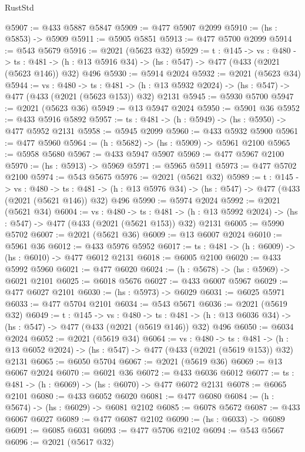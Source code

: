 \begin{lexlean}{RustStd}
\begin{coremodule}
{\begin{coremodule}
{{{{{{{{{{{{{{{{@5907 := @433 @5887 @5847
@5909 := @477 @5907 @2099
@5910 := (hs : @5853) -> @5909
@5911 := @5905 @5851
@5913 := @477 @5700 @2099
@5914 := @543 @5679
@5916 := @2021 (@5623 @32)
@5929 := {t : @145} ->
  {vs : @480} ->
  {ts : @481} -> (h : @13 @5916 @34) -> (hs : @547) -> @477 (@433 (@2021 (@5623 @146)) @32) @496
@5930 := @5914 @2024
@5932 := @2021 (@5623 @34)
@5944 := {vs : @480} ->
  {ts : @481} -> (h : @13 @5932 @2024) -> (hs : @547) -> @477 (@433 (@2021 (@5623 @153)) @32) @2131
@5945 := @5930 @5700
@5947 := @2021 (@5623 @36)
@5949 := @13 @5947 @2024
@5950 := @5901 @36
@5952 := @433 @5916 @5892
@5957 := {ts : @481} -> (h : @5949) -> (hs : @5950) -> @477 @5952 @2131
@5958 := @5945 @2099
@5960 := @433 @5932 @5900
@5961 := @477 @5960
@5964 := (h : @5682) -> (hs : @5909) -> @5961 @2100
@5965 := @5958 @5680
@5967 := @433 @5947 @5907
@5969 := @477 @5967 @2100
@5970 := (hs : @5913) -> @5969
@5971 := @5965 @5911
@5973 := @477 @5702 @2100
@5974 := @543 @5675
@5976 := @2021 (@5621 @32)
@5989 := {t : @145} ->
  {vs : @480} ->
  {ts : @481} -> (h : @13 @5976 @34) -> (hs : @547) -> @477 (@433 (@2021 (@5621 @146)) @32) @496
@5990 := @5974 @2024
@5992 := @2021 (@5621 @34)
@6004 := {vs : @480} ->
  {ts : @481} -> (h : @13 @5992 @2024) -> (hs : @547) -> @477 (@433 (@2021 (@5621 @153)) @32) @2131
@6005 := @5990 @5702
@6007 := @2021 (@5621 @36)
@6009 := @13 @6007 @2024
@6010 := @5961 @36
@6012 := @433 @5976 @5952
@6017 := {ts : @481} -> (h : @6009) -> (hs : @6010) -> @477 @6012 @2131
@6018 := @6005 @2100
@6020 := @433 @5992 @5960
@6021 := @477 @6020
@6024 := (h : @5678) -> (hs : @5969) -> @6021 @2101
@6025 := @6018 @5676
@6027 := @433 @6007 @5967
@6029 := @477 @6027 @2101
@6030 := (hs : @5973) -> @6029
@6031 := @6025 @5971
@6033 := @477 @5704 @2101
@6034 := @543 @5671
@6036 := @2021 (@5619 @32)
@6049 := {t : @145} ->
  {vs : @480} ->
  {ts : @481} -> (h : @13 @6036 @34) -> (hs : @547) -> @477 (@433 (@2021 (@5619 @146)) @32) @496
@6050 := @6034 @2024
@6052 := @2021 (@5619 @34)
@6064 := {vs : @480} ->
  {ts : @481} -> (h : @13 @6052 @2024) -> (hs : @547) -> @477 (@433 (@2021 (@5619 @153)) @32) @2131
@6065 := @6050 @5704
@6067 := @2021 (@5619 @36)
@6069 := @13 @6067 @2024
@6070 := @6021 @36
@6072 := @433 @6036 @6012
@6077 := {ts : @481} -> (h : @6069) -> (hs : @6070) -> @477 @6072 @2131
@6078 := @6065 @2101
@6080 := @433 @6052 @6020
@6081 := @477 @6080
@6084 := (h : @5674) -> (hs : @6029) -> @6081 @2102
@6085 := @6078 @5672
@6087 := @433 @6067 @6027
@6089 := @477 @6087 @2102
@6090 := (hs : @6033) -> @6089
@6091 := @6085 @6031
@6093 := @477 @5706 @2102
@6094 := @543 @5667
@6096 := @2021 (@5617 @32)
}}}}}}}}}}}}}}}}
\end{coremodule}}
\end{coremodule}
\end{lexlean}
